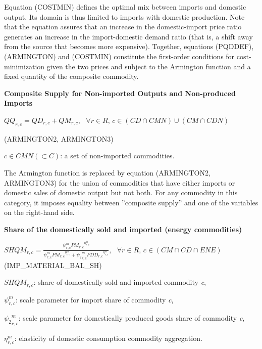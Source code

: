 \documentclass[10pt,a4paper,titlepage,dvipdfmx]{book}
\begin{document}
Equation (COSTMIN) defines the optimal mix between imports and domestic output. Its domain is thus limited to imports with domestic production. Note that the equation assures that an increase in the domestic-import price ratio generates an increase in the import-domestic demand ratio (that is, a shift away from the source that becomes more expensive). Together, equations (PQDDEF), (ARMINGTON) and (COSTMIN) constitute the first-order conditions for cost-minimization given the two prices and subject to the Armington function and a fixed quantity of the composite commodity.

\begin{flushleft}\textbf{Composite Supply for Non-imported Outputs and Non-produced Imports}\end{flushleft}


\begin{center}$QQ_{r,c}=QD_{r,c}+QM_{r,c},\,\,\,\,\forall r\in R,\,c\in \left(CD\cap CMN\right)\cup \left(CM\cap CDN\right)$ 
\end{center}


\begin{flushright}(ARMINGTON2, ARMINGTON3)
\end{flushright}

\begin{flushleft} $c\in CMN\left(\subset C\right)$: a set of non-imported commodities. \end{flushleft}

The Armington function is replaced by equation (ARMINGTON2, ARMINGTON3) for the union of commodities that have either imports or domestic sales of domestic output but not both. For any commodity in this category, it imposes equality between ''composite supply'' and one of the variables on the right-hand side.

\begin{flushleft}\textbf{Share of the domestically sold and imported (energy commodities)}\end{flushleft}


\begin{center}$SHQM_{r,c}=\frac{\psi _{r,c}^{m}P{M_{r,c}}^{\eta _{r,c}^{m}}}{\psi _{r,c}^{m}P{M_{r,c}}^{\eta _{r,c}^{m}}+{\psi _{2}}_{r,c}^{m}PD{D_{r,c}}^{\eta _{r,c}^{m}}},\,\,\,\,\forall r\in R,\,c\in \left(CM\cap CD\cap ENE\right)$ (IMP\_MATERIAL\_BAL\_SH)
\end{center}

\begin{flushleft}
$SHQM_{r,c}$: share of domestically sold and imported commodity \textit{c},

$\psi _{r,c}^{m}$: scale parameter for import share of commodity \textit{c}, 

${\psi _{2}}_{r,c}^{m}$: scale parameter for domestically produced goods share of commodity \textit{c},

$\eta _{r,c}^{m}$: elasticity of domestic consumption commodity aggregation.
\end{flushleft}
\end{document}
